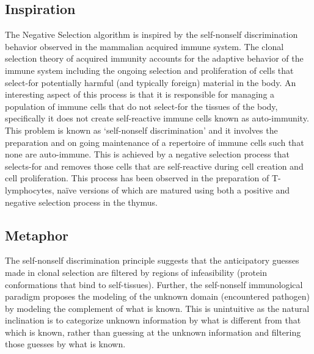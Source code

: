 \subsection{Inspiration}
The Negative Selection algorithm is inspired by the self-nonself discrimination behavior observed in the mammalian acquired immune system.
The clonal selection theory of acquired immunity accounts for the adaptive behavior of the immune system including the ongoing selection and proliferation of cells that select-for potentially harmful (and typically foreign) material in the body.
An interesting aspect of this process is that it is responsible for managing a population of immune cells that do not select-for the tissues of the body, specifically it does not create self-reactive immune cells known as auto-immunity. 
This problem is known as `self-nonself discrimination' and it involves the preparation and on going maintenance of a repertoire of immune cells such that none are auto-immune. This is achieved by a negative selection process that selects-for and removes those cells that are self-reactive during cell creation and cell proliferation. This process has been observed in the preparation of T-lymphocytes, na\"ive versions of which are matured using both a positive and negative selection process in the thymus.

\subsection{Metaphor}
The self-nonself discrimination principle suggests that the anticipatory guesses made in clonal selection are filtered by regions of infeasibility (protein conformations that bind to self-tissues). Further, the self-nonself immunological paradigm proposes the modeling of the unknown domain (encountered pathogen) by modeling the complement of what is known. This is unintuitive as the natural inclination is to categorize unknown information by what is different from that which is known, rather than guessing at the unknown information and filtering those guesses by what is known. 

